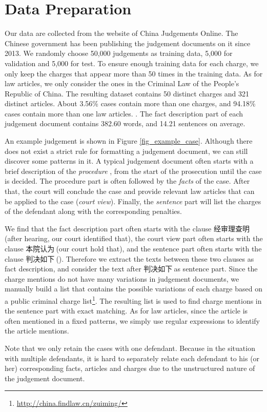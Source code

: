 \section{Data Preparation} 
Our data are collected from the website of China Judgements Online. The Chinese government has been publishing the judgement documents on it since 2013.
We randomly choose 50,000 judgements as training data, 5,000 for validation and 5,000 for test. To ensure enough training data for each charge, we only keep the charges that appear more than 50 times in the training data. As for law articles, we only consider the ones in the Criminal Law of the People's Republic of China. The resulting dataset contains 50 distinct charges and 321 distinct articles. About 3.56\% cases contain more than one charges, and 94.18\% cases contain more than one law articles. . The fact description part of each judgement document contains 382.60 words, and 14.21 sentences on average.

An example judgement is shown in Figure \ref{fig_example_case}. Although there does not exist a strict rule for formatting a judgement document, we can still discover some patterns in it. A typical judgement document often starts with a brief description of the \emph{procedure} , from the start of the prosecution until the case is decided. The procedure part is often followed by the \emph{facts} of the case. After that, the court will conclude the case and provide relevant law articles that can be applied to the case (\emph{court view}). Finally, the \emph{sentence} part will list the charges of the defendant along with the corresponding penalties. 

We find that the fact description part often starts with the clause 经审理查明$\ $(after hearing, our court identified that), the court view part often starts with the clause 本院认为$\ $(our court hold that), and the sentence part often starts with the clause 判决如下$\ $(). Therefore we extract the texts between these two clauses as fact description, and consider the text after 判决如下$\ $as sentence part. Since the charge mentions do not have many variations in judgement documents, we manually build a list that contains the possible variations of each charge based on a public criminal charge list\footnote{\url{http://china.findlaw.cn/zuiming/}}. The resulting list is used to find charge mentions in the sentence part with exact matching. As for law articles, since the article is often mentioned in a fixed patterns, we simply use regular expressions
to identify the article mentions. 

Note that we only retain the cases with one defendant. Because in the situation with multiple defendants, it is hard to separately relate each defendant to his (or her) corresponding facts, articles and charges due to the unstructured nature of the judgement document.